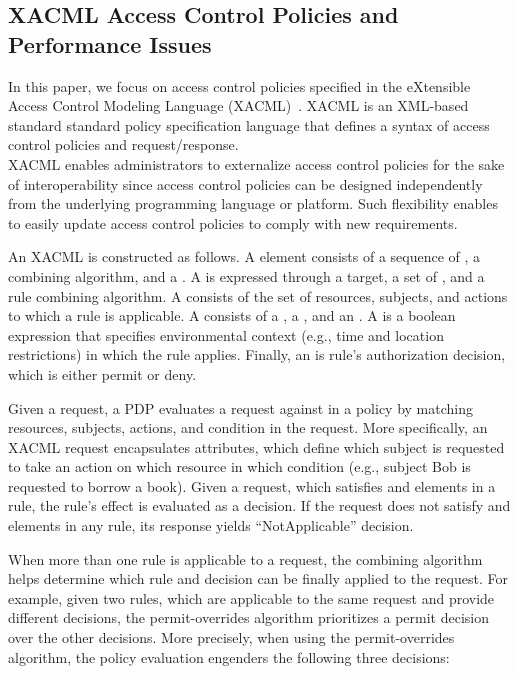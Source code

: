 \subsection{XACML Access Control Policies and Performance Issues}

In this paper, we focus on access control policies specified in the eXtensible Access Control Modeling Language (XACML)~\cite{sunxacml}.
XACML is an XML-based standard standard policy specification language that defines a syntax of access control policies and
request/response. \\XACML enables administrators to externalize access control policies for the sake of interoperability since access control policies can be designed 
independently from the underlying programming language or platform. Such flexibility enables to easily update access control policies to comply with new requirements.

An XACML is constructed as follows.
A  element consists of a sequence of , a combining algorithm, and
a . A  is expressed through a target, a set of , and a rule combining algorithm. 
A  consists of the set of resources, subjects, and actions to which a rule is applicable. A  consists of a 
, a , and an . A  is a boolean expression that specifies 
environmental context (e.g., time and location restrictions) in which the rule applies.
Finally, an  is rule's authorization decision, which is either permit or deny.

Given a request, a PDP evaluates a request against  in a policy by matching resources, subjects, actions, and condition in the request.
More specifically, an XACML request encapsulates attributes, which define which subject is requested to take an action on which resource in which
condition (e.g., subject Bob is requested to borrow a book).
Given a request, which satisfies  and  elements in a rule, the rule's effect
is evaluated as a decision.
If the request does not satisfy  and  elements in any rule, its response yields ``NotApplicable'' decision.

When more than one rule is applicable to a request, the combining algorithm helps determine which rule and decision can be finally
applied to the request.
For example, given two rules, which are applicable to the same request and provide different decisions,
the permit-overrides algorithm prioritizes a permit decision over the other decisions.
More precisely, when using the permit-overrides algorithm, the policy evaluation engenders the following three decisions: 

